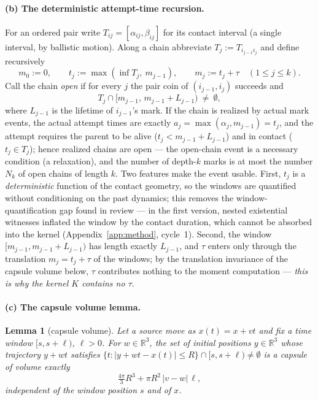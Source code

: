 \documentclass[11pt]{article}
\newtheorem{lemma}{Lemma}
\newcommand{\R}{\mathbb{R}}
\begin{document}
\paragraph{(b) The deterministic attempt-time recursion.}
For an ordered pair write $T_{ij}=[\alpha_{ij},\beta_{ij}]$ for its contact
interval (a single interval, by ballistic motion). Along a chain abbreviate
$T_j:=T_{i_{j-1}i_j}$ and define recursively
\[
  m_0:=0,\qquad t_j:=\max(\inf T_j,\ m_{j-1}),\qquad
  m_j:=t_j+\tau \quad(1\le j\le k).
\]
Call the chain \emph{open} if for every $j$ the pair coin of
$(i_{j-1},i_j)$ succeeds and
\[
  T_j\cap[m_{j-1},\,m_{j-1}+L_{j-1})\ \neq\ \emptyset,
\]
where $L_{j-1}$ is the lifetime of $i_{j-1}$'s mark. If the chain is
realized by actual mark events, the actual attempt times are exactly
$a_j=\max(\alpha_j,m_{j-1})=t_j$, and the attempt requires the parent to be
alive ($t_j<m_{j-1}+L_{j-1}$) and in contact ($t_j\in T_j$); hence realized
chains are open --- the open-chain event is a necessary condition
(a relaxation), and the number of depth-$k$ marks is at most the number
$N_k$ of open chains of length $k$. Two features make the event usable.
First, $t_j$ is a \emph{deterministic} function of the contact geometry, so
the windows are quantified without conditioning on the past dynamics; this
removes the window-quantification gap found in review --- in the first
version, nested existential witnesses inflated the window by the contact
duration, which cannot be absorbed into the kernel (Appendix~\ref{app:method},
cycle~1). Second, the window $[m_{j-1},m_{j-1}+L_{j-1})$ has length exactly
$L_{j-1}$, and $\tau$ enters only through the translation $m_j=t_j+\tau$ of
the windows; by the translation invariance of the capsule volume below,
$\tau$ contributes nothing to the moment computation --- \emph{this is why
the kernel $K$ contains no $\tau$}.

\paragraph{(c) The capsule volume lemma.}
\begin{lemma}[capsule volume]\label{lem:capsule}
Let a source move as $x(t)=x+vt$ and fix a time window $[s,s+\ell)$,
$\ell>0$. For $w\in\R^3$, the set of initial positions $y\in\R^3$ whose
trajectory $y+wt$ satisfies
$\{t:|y+wt-x(t)|\le R\}\cap[s,s+\ell)\neq\emptyset$ is a capsule of volume
exactly
\[
  \tfrac{4\pi}{3}R^3+\pi R^2\,|v-w|\,\ell,
\]
independent of the window position $s$ and of $x$.
\end{lemma}
\end{document}
